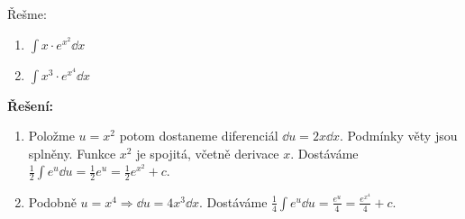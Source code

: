\begin{mdframed}[style=mdexam]
  \begin{example}\label{MAI:exam119}
    Řešme:
    \begin{enumerate}[label=\alph*)]
      \item \(\displaystyle\int x\cdot e^{x^2}\dd{x}\)
      \item \(\displaystyle\int x^3\cdot e^{x^4}\dd{x}\)
    \end{enumerate}

    \noindent\textbf{Řešení:}

    \begin{enumerate}[label=\alph*)]
      \item Položme \(u=x^2\) potom dostaneme diferenciál \(\dd{u}=2x\dd{x}\). Podmínky věty jsou
            splněny. Funkce \(x^2\) je spojitá, včetně derivace \(x\). Dostáváme
            \(\frac{1}{2}\int{e^u\dd{u}}=\frac{1}{2}e^u=\frac{1}{2}e^{x^2} + c\). 
      \item Podobně \(u=x^4 \Rightarrow \dd{u}=4x^3\dd{x}\). Dostáváme 
            \(\frac{1}{4}\int{e^u}\dd{u} = \frac{e^u}{4} = \frac{e^{x^4}}{4} + c \).
    \end{enumerate}
  \end{example}
\end{mdframed}